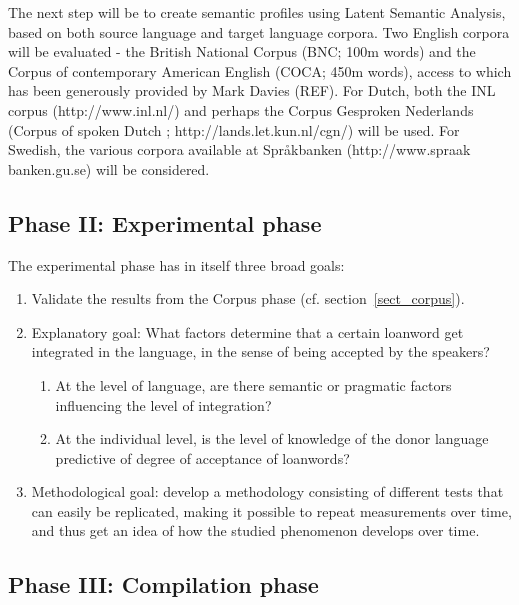 \documentclass[a4paper]{article}
\begin{document}
The next step will be to create semantic profiles using Latent Semantic Analysis, based on both source language and target language corpora. Two English corpora will be evaluated - the British National Corpus (BNC; 100m words) and the Corpus of contemporary American English (COCA; 450m words), access to which has been generously provided by Mark Davies (REF). For Dutch, both the INL corpus (http://www.inl.nl/) and perhaps the Corpus Gesproken Nederlands (Corpus of spoken Dutch ; http://lands.let.kun.nl/cgn/) will be used. For Swedish, the various corpora available at Spr\aa kbanken (http://www.spraak\\banken.gu.se) will be considered.



\subsection{Phase II: Experimental phase}

The experimental phase has in itself three broad goals:
\begin{enumerate}
	\item Validate the results from the Corpus phase (cf. section~\ref{sect_corpus}).
	\item Explanatory goal:
	What factors determine that a certain loanword get integrated in the language, in the sense of being accepted by the speakers?
	\begin{enumerate}
		\item At the level of language, are there semantic or pragmatic factors influencing the level of integration?
		\item At the individual level, is the level of knowledge of the donor language predictive of degree of acceptance of loanwords?
	\end{enumerate}
	\item Methodological goal: develop a methodology consisting of different tests that can easily be replicated, making it possible to repeat measurements over time, and thus get an idea of how the studied phenomenon develops over time. 
\end{enumerate}
	




\subsection{Phase III: Compilation phase}
\end{document}
